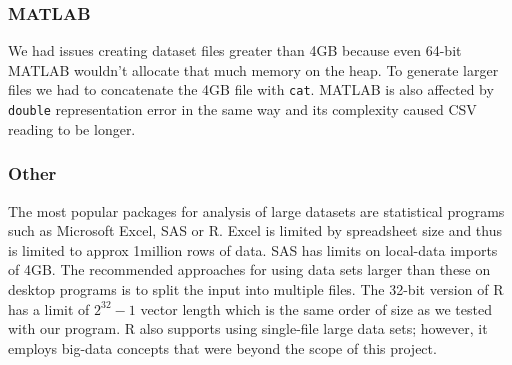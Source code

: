\subsubsection{MATLAB}
We had issues creating dataset files greater than 4GB because even 64-bit MATLAB wouldn't allocate that much memory on the heap. To generate larger files we had to concatenate the 4GB file with \texttt{cat}. MATLAB is also affected by \texttt{double} representation error in the same way and its complexity caused CSV reading to be longer.

\subsubsection{Other}
The most popular packages for analysis of large datasets are statistical programs such as Microsoft Excel, SAS or R. Excel is limited by spreadsheet size and thus is limited to approx 1million rows of data. SAS has limits on local-data imports of 4GB. The recommended approaches for using data sets larger than these on desktop programs is to split the input into multiple files. The 32-bit version of R has a limit of $2^{32} - 1$ vector length which is the same order of size as we tested with our program. R also supports using single-file large data sets; however, it employs big-data concepts that were beyond the scope of this project.
